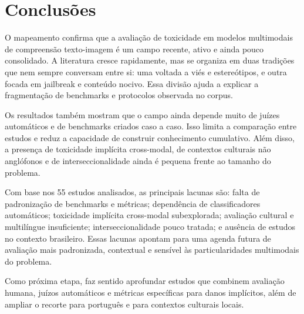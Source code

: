 \documentclass[12pt]{article}
\begin{document}
\section{Conclusões}

O mapeamento confirma que a avaliação de toxicidade em modelos multimodais de compreensão texto-imagem é um campo recente, ativo e ainda pouco consolidado. A literatura cresce rapidamente, mas se organiza em duas tradições que nem sempre conversam entre si: uma voltada a viés e estereótipos, e outra focada em jailbreak e conteúdo nocivo. Essa divisão ajuda a explicar a fragmentação de benchmarks e protocolos observada no corpus.

Os resultados também mostram que o campo ainda depende muito de juízes automáticos e de benchmarks criados caso a caso. Isso limita a comparação entre estudos e reduz a capacidade de construir conhecimento cumulativo. Além disso, a presença de toxicidade implícita cross-modal, de contextos culturais não anglófonos e de interseccionalidade ainda é pequena frente ao tamanho do problema.

Com base nos 55 estudos analisados, as principais lacunas são: falta de padronização de benchmarks e métricas; dependência de classificadores automáticos; toxicidade implícita cross-modal subexplorada; avaliação cultural e multilíngue insuficiente; interseccionalidade pouco tratada; e ausência de estudos no contexto brasileiro. Essas lacunas apontam para uma agenda futura de avaliação mais padronizada, contextual e sensível às particularidades multimodais do problema.

Como próxima etapa, faz sentido aprofundar estudos que combinem avaliação humana, juízos automáticos e métricas específicas para danos implícitos, além de ampliar o recorte para português e para contextos culturais locais.



\end{document}
